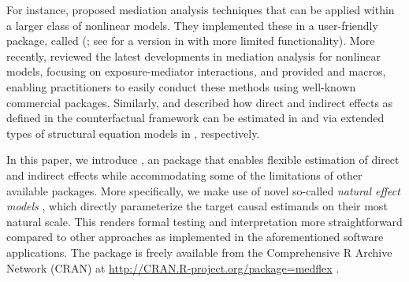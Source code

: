\documentclass[nojss]{jss}
\begin{document}
\par For instance, \cite{Imai2010b} proposed mediation analysis techniques that can be applied within a larger class of nonlinear models. They implemented these in a user-friendly  package, called  (\citealp{R:mediation}; see \citealp{Hicks2011} for a version in  \citep{stata} with more limited functionality). More recently, \cite{Valeri2013} reviewed the latest developments in mediation analysis for nonlinear models, focusing on exposure-mediator interactions, and provided  \citep{sas} and  \citep{spss} macros, enabling practitioners to easily conduct these methods using well-known commercial packages. Similarly, \cite{Emsley2013} and \cite{Muthen2014} described how direct and indirect effects as defined in the counterfactual framework can be estimated in  and via extended types of structural equation models in  \citep{mplus}, respectively.
\par In this paper, we introduce  \citep{R:medflex}, an  package that enables flexible estimation of direct and indirect effects while accommodating some of the limitations of other available packages. More specifically, we make use of novel so-called \textit{natural effect models} \citep{Lange2012,Lange2013a,Loeys2013a,Vansteelandt2012}, which directly parameterize the target causal estimands on their most natural scale. This renders formal testing and interpretation more straightforward compared to other approaches as implemented in the aforementioned software applications. The  package is freely available from the Comprehensive R Archive Network (CRAN) at \url{http://CRAN.R-project.org/package=medflex} \citep{R:base}.
\end{document}
